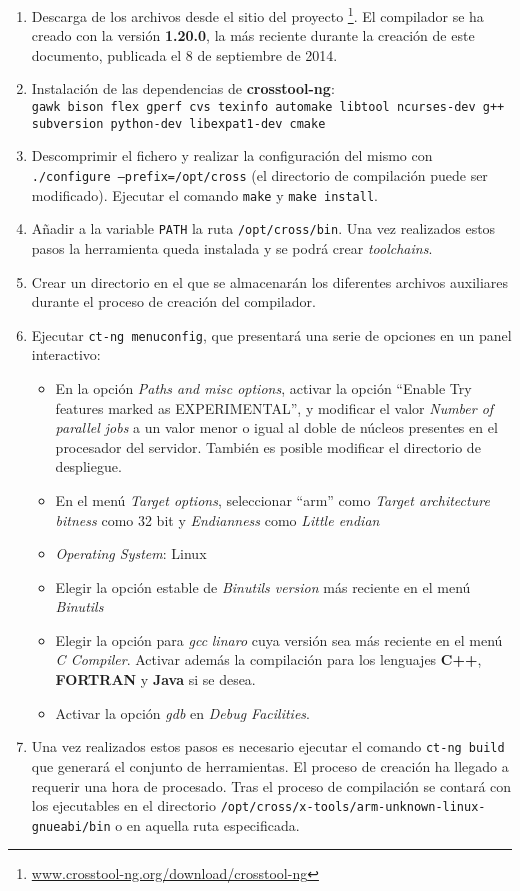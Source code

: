 \documentclass{article}
\begin{document}
\begin{enumerate}
	\item Descarga de los archivos desde el sitio del proyecto \footnote{\href{www.crosstool-ng.org/download/crosstool-ng}{www.crosstool-ng.org/download/crosstool-ng}}. El compilador se ha creado con la versión \textbf{1.20.0}, la más reciente durante la creación de este documento, publicada el 8 de septiembre de 2014.
	\item Instalación de las dependencias de \textbf{crosstool-ng}:\\
		\texttt{gawk bison flex gperf cvs texinfo automake libtool ncurses-dev g++ subversion python-dev libexpat1-dev cmake}
	\item Descomprimir el fichero y realizar la configuración del mismo con \texttt{./configure --prefix=/opt/cross} (el directorio de compilación puede ser modificado). Ejecutar el comando \texttt{make} y \texttt{make install}.
	\item Añadir a la variable \texttt{PATH} la ruta \texttt{/opt/cross/bin}.
	Una vez realizados estos pasos la herramienta queda instalada y se podrá crear \textit{toolchains}.
	\item Crear un directorio en el que se almacenarán los diferentes archivos auxiliares durante el proceso de creación del compilador.
	\item Ejecutar \texttt{ct-ng menuconfig}, que presentará una serie de opciones en un panel interactivo:

	\begin{itemize}
		\item En la opción \textit{Paths and misc options}, activar la opción ``Enable Try features marked as EXPERIMENTAL'', y modificar el valor \textit{Number of parallel jobs} a un valor menor o igual al doble de núcleos presentes en el procesador del servidor. También es posible modificar el directorio de despliegue.
		\item En el menú \textit{Target options}, seleccionar ``arm'' como \textit{Target architecture} \textit{bitness} como 32 bit y \textit{Endianness} como \textit{Little endian}
		\item \textit{Operating System}: Linux
		\item Elegir la opción estable de \textit{Binutils version} más reciente en el menú \textit{Binutils}
		\item Elegir la opción para \textit{gcc} \textit{linaro} cuya versión sea más reciente en el menú \textit{C Compiler}. Activar además la compilación para los lenguajes \textbf{C++}, \textbf{FORTRAN} y \textbf{Java} si se desea.
		\item Activar la opción \textit{gdb} en \textit{Debug Facilities}.
	\end{itemize}
	\item Una vez realizados estos pasos es necesario ejecutar el comando \texttt{ct-ng build} que generará el conjunto de herramientas. El proceso de creación ha llegado a requerir una hora de procesado. Tras el proceso de compilación se contará con los ejecutables en el directorio \texttt{/opt/cross/x-tools/arm-unknown-linux-gnueabi/bin} o en aquella ruta especificada.

\end{enumerate}
\end{document}
